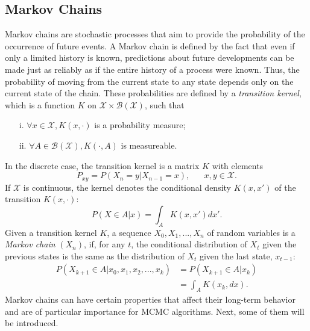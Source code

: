 \documentclass[12pt]{book}
\begin{document}
\subsection{Markov Chains}
Markov chains are stochastic processes that aim to provide the probability of the occurrence of future events. A Markov chain is defined by the fact that even if only a limited history is known, predictions about future developments can be made just as reliably as if the entire history of a process were known. Thus, the probability of moving from the current state to any state depends only on the current state of the chain. These probabilities are defined by a \textit{transition kernel}, which is a function $K$ on $\mathcal{X} \times \mathcal{B}\left(\mathcal{X}\right)$, such that
\begin{itemize}
    \item[i.] $\forall x\in\mathcal{X}, K\left(x, \cdot\right)$ is a probability measure;
    \item[ii.] $\forall A\in \mathcal{B}\left(\mathcal{X}\right), K\left(\cdot, A\right)$ is measureable.
\end{itemize}
In the discrete case, the transition kernel is a matrix $K$ with elements
\begin{equation*}
    P_{xy}=P\left(X_n=y|X_{n-1}=x\right), \hspace{20pt}x,y\in\mathcal{X}.
\end{equation*}
If $\mathcal{X}$ is continuous, the kernel denotes the conditional density $K\left(x,x'\right)$ of the transition $K\left(x,\cdot\right)$:
\begin{equation*}
    P\left(X\in A|x\right)=\int_AK\left(x,x'\right)dx'.
\end{equation*}
Given a transition kernel $K$, a sequence $X_0,X_1,...,X_n$ of random variables is a \textit{Markov chain} $\left(X_n\right)$, if, for any $t$, the conditional distribution of $X_t$ given the previous states is the same as the distribution of $X_t$ given the last state, $x_{t-1}$:
\begin{align}
    P\left(X_{k+1}\in A|x_0,x_1,x_2,...,x_k\right) &= P\left(X_{k+1}\in A|x_k\right) \nonumber\\
    &= \int_A K\left(x_k, dx\right). 
\end{align}
Markov chains can have certain properties that affect their long-term behavior and are of particular importance for MCMC algorithms. Next, some of them will be introduced.
\end{document}

